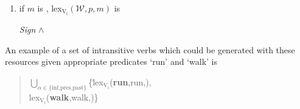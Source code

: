\begin{enumerate}
\item if $m$ is ,
  lex$_{\mathrm{V_{\mathrm{i}}}}(\mathcal{W},p,m)$ is 

\hspace*{-2em}\textit{Sign} \d{$\wedge$} \\
\hspace*{-2em}

 
\end{enumerate}

An example of a set of intransitive verbs which could be generated
with these resources given appropriate predicates `run' and `walk' is
\begin{quote}
\begin{tabbing}
$\bigcup_{\alpha\in\{\textrm{inf,pres,past}\}}$\{\=lex$_{\mathrm{V_{\mathrm{i}}}}$(\textbf{\textsf{run}},run,),
\\
\>
lex$_{\mathrm{V_{\mathrm{i}}}}$(\textbf{\textsf{walk}},walk,)\}
\end{tabbing}
\end{quote} 
  

